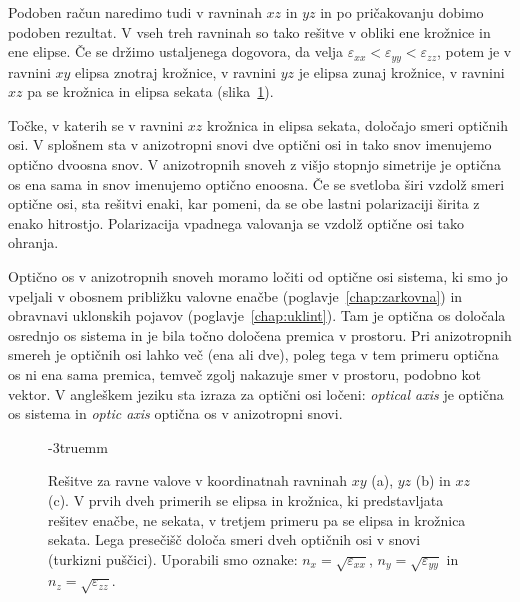 Podoben račun naredimo tudi v ravninah $xz$ in $yz$ in po pričakovanju dobimo podoben rezultat. V vseh treh
ravninah so tako rešitve v obliki ene krožnice in ene elipse. Če se držimo ustaljenega dogovora, 
da velja $\varepsilon_{xx}<\varepsilon_{yy}<\varepsilon_{zz}$, potem je v ravnini $xy$ elipsa znotraj krožnice,
v ravnini $yz$ je elipsa zunaj krožnice, v ravnini $xz$ pa se krožnica in elipsa sekata 
(slika~\ref{fig:10_ploskev_preseki}).

Točke, v katerih se v ravnini $xz$ krožnica in elipsa sekata, določajo smeri optičnih osi. 
V splošnem sta v anizotropni snovi dve optični osi in tako snov imenujemo optično dvoosna snov. V 
anizotropnih snoveh z višjo stopnjo simetrije je optična os ena sama in snov imenujemo optično enoosna. 
Če se svetloba širi vzdolž smeri optične osi, sta rešitvi enaki, kar pomeni, da se obe lastni 
polarizaciji širita z enako hitrostjo. Polarizacija vpadnega valovanja se vzdolž optične osi tako ohranja.

\begin{remark}
Optično os v anizotropnih snoveh moramo ločiti od optične osi sistema, ki smo jo vpeljali v obosnem
približku valovne enačbe (poglavje~\ref{chap:zarkovna}) in obravnavi uklonskih pojavov 
(poglavje~\ref{chap:uklint}). Tam je optična os določala osrednjo os sistema in je bila točno določena 
premica v prostoru. Pri anizotropnih smereh je optičnih osi lahko več (ena ali dve), poleg tega
 v tem primeru optična os ni ena sama premica, temveč zgolj nakazuje smer v prostoru, podobno kot vektor. 
V angleškem jeziku sta izraza za optični osi ločeni: {\it optical axis} je optična os sistema 
in {\it optic axis} optična os v anizotropni snovi.
\end{remark}

\begin{figure}[h]
\centering
\def\svgwidth{140truemm} 

\caption{Rešitve za ravne valove v koordinatnah ravninah $xy$ (a), $yz$ (b) in $xz$ (c).
V prvih dveh primerih se elipsa in krožnica, ki predstavljata rešitev enačbe, ne sekata, v tretjem
primeru pa se elipsa in krožnica sekata. Lega presečišč določa smeri dveh optičnih osi v snovi (turkizni puščici).
Uporabili smo oznake: $n_x = \sqrt{\varepsilon_{xx}}$, $n_y = \sqrt{\varepsilon_{yy}}$ in $n_z = \sqrt{\varepsilon_{zz}}$.}
\label{fig:10_ploskev_preseki}
\vglue-3truemm
\end{figure}

